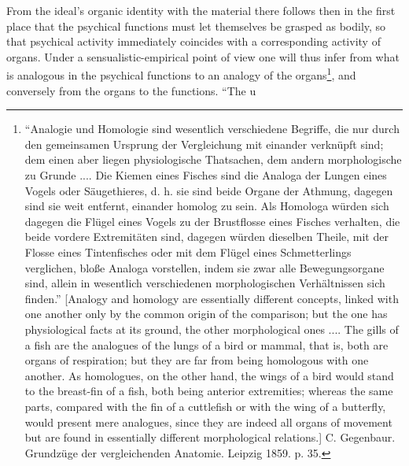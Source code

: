 \documentclass[12pt,a4paper]{book}
\begin{document}
From the ideal's organic identity with the material there follows then in the first
place that the psychical functions must let themselves be grasped as bodily, so that
psychical activity immediately coincides with a corresponding activity of organs.
Under a sensualistic-empirical point of view one will thus infer from what is
analogous in the psychical functions to an analogy of the organs\footnote{``Analogie
und Homologie sind wesentlich verschiedene Begriffe, die nur durch den gemeinsamen
Ursprung der Vergleichung mit einander verknüpft sind; dem einen aber liegen
physiologische Thatsachen, dem andern morphologische zu Grunde .... Die Kiemen eines
Fisches sind die Analoga der Lungen eines Vogels oder Säugethieres, d. h. sie sind
beide Organe der Athmung, dagegen sind sie weit entfernt, einander homolog zu sein.
Als Homologa würden sich dagegen die Flügel eines Vogels zu der Brustflosse eines
Fisches verhalten, die beide vordere Extremitäten sind, dagegen würden dieselben
Theile, mit der Flosse eines Tintenfisches oder mit dem Flügel eines Schmetterlings
verglichen, bloße Analoga vorstellen, indem sie zwar alle Bewegungsorgane sind,
allein in wesentlich verschiedenen morphologischen Verhältnissen sich finden.''
[Analogy and homology are essentially different concepts, linked with one another
only by the common origin of the comparison; but the one has physiological facts at
its ground, the other morphological ones .... The gills of a fish are the analogues
of the lungs of a bird or mammal, that is, both are organs of respiration; but they
are far from being homologous with one another. As homologues, on the other hand,
the wings of a bird would stand to the breast-fin of a fish, both being anterior
extremities; whereas the same parts, compared with the fin of a cuttlefish or with
the wing of a butterfly, would present mere analogues, since they are indeed all
organs of movement but are found in essentially different morphological relations.]
C. Gegenbaur. Grundzüge der vergleichenden Anatomie. Leipzig 1859. p. 35.}, and
conversely from the organs to the functions. ``The u%
\end{document}
